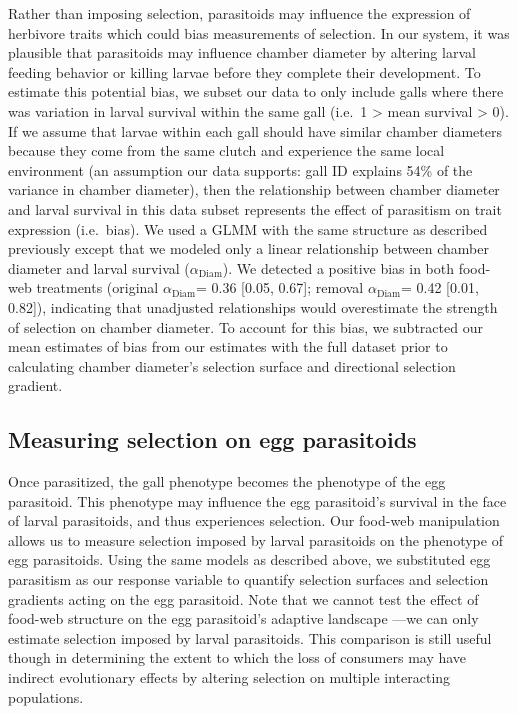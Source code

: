 \documentclass[11pt,]{article}
\begin{document}
Rather than imposing selection, parasitoids may influence the expression
of herbivore traits which could bias measurements of selection. In our
system, it was plausible that parasitoids may influence chamber diameter
by altering larval feeding behavior or killing larvae before they
complete their development. To estimate this potential bias, we subset
our data to only include galls where there was variation in larval
survival within the same gall (i.e.~1 \textgreater{} mean survival
\textgreater{} 0). If we assume that larvae within each gall should have
similar chamber diameters because they come from the same clutch and
experience the same local environment (an assumption our data supports:
gall ID explains 54\% of the variance in chamber diameter), then the
relationship between chamber diameter and larval survival in this data
subset represents the effect of parasitism on trait expression
(i.e.~bias). We used a GLMM with the same structure as described
previously except that we modeled only a linear relationship between
chamber diameter and larval survival (\(\alpha_{\text{Diam}}\)). We
detected a positive bias in both food-web treatments (original
\(\alpha_{\text{Diam}}\)= 0.36 {[}0.05, 0.67{]}; removal
\(\alpha_{\text{Diam}}\)= 0.42 {[}0.01, 0.82{]}), indicating that
unadjusted relationships would overestimate the strength of selection on
chamber diameter. To account for this bias, we subtracted our mean
estimates of bias from our estimates with the full dataset prior to
calculating chamber diameter's selection surface and directional
selection gradient.

\subsection{Measuring selection on egg
parasitoids}\label{measuring-selection-on-egg-parasitoids}

Once parasitized, the gall phenotype becomes the phenotype of the egg
parasitoid. This phenotype may influence the egg parasitoid's survival
in the face of larval parasitoids, and thus experiences selection. Our
food-web manipulation allows us to measure selection imposed by larval
parasitoids on the phenotype of egg parasitoids. Using the same models
as described above, we substituted egg parasitism as our response
variable to quantify selection surfaces and selection gradients acting
on the egg parasitoid. Note that we cannot test the effect of food-web
structure on the egg parasitoid's adaptive landscape ---we can only
estimate selection imposed by larval parasitoids. This comparison is
still useful though in determining the extent to which the loss of
consumers may have indirect evolutionary effects by altering selection
on multiple interacting populations.
\end{document}
